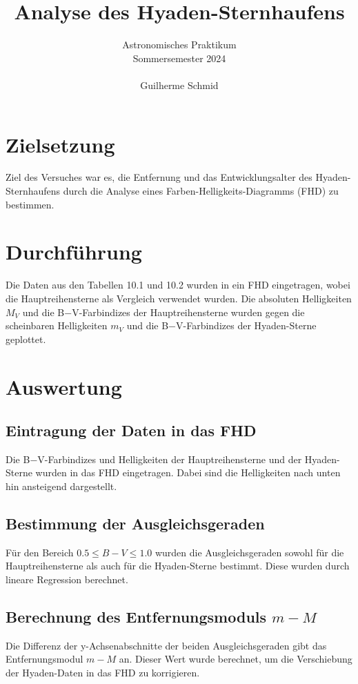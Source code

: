 \documentclass[a4paper,12pt]{article}
\title{Analyse des Hyaden-Sternhaufens}
\author{Astronomisches Praktikum \\
Sommersemester 2024\\\\
Guilherme Schmid}
\date{}
\begin{document}
\maketitle

\section*{Zielsetzung}
Ziel des Versuches war es, die Entfernung und das Entwicklungsalter des Hyaden-Sternhaufens durch die Analyse eines Farben-Helligkeits-Diagramms (FHD) zu bestimmen.

\section*{Durchführung}
Die Daten aus den Tabellen 10.1 und 10.2 wurden in ein FHD eingetragen, wobei die Hauptreihensterne als Vergleich verwendet wurden. Die absoluten Helligkeiten \( M_V \) und die B−V-Farbindizes der Hauptreihensterne wurden gegen die scheinbaren Helligkeiten \( m_V \) und die B−V-Farbindizes der Hyaden-Sterne geplottet.

\section*{Auswertung}

\subsection*{Eintragung der Daten in das FHD}
Die B−V-Farbindizes und Helligkeiten der Hauptreihensterne und der Hyaden-Sterne wurden in das FHD eingetragen. Dabei sind die Helligkeiten nach unten hin ansteigend dargestellt.

\subsection*{Bestimmung der Ausgleichsgeraden}
Für den Bereich \( 0.5 \leq B−V \leq 1.0 \) wurden die Ausgleichsgeraden sowohl für die Hauptreihensterne als auch für die Hyaden-Sterne bestimmt. Diese wurden durch lineare Regression berechnet.

\subsection*{Berechnung des Entfernungsmoduls \( m - M \)}
Die Differenz der y-Achsenabschnitte der beiden Ausgleichsgeraden gibt das Entfernungsmodul \( m - M \) an. Dieser Wert wurde berechnet, um die Verschiebung der Hyaden-Daten in das FHD zu korrigieren.
\end{document}
